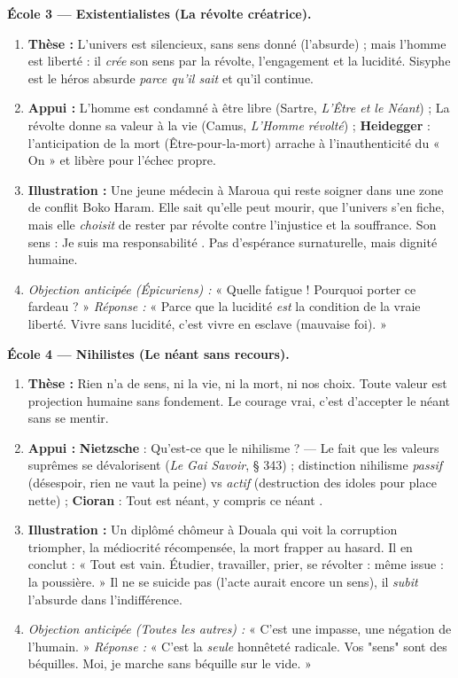 \documentclass[11pt]{article}
\newcommand{\cle}[1]{{\popxbold\color{popdark}#1}}
\begin{document}
\begin{exoresolu}
\textbf{École 3 — Existentialistes (La révolte créatrice).}
\begin{enumerate}
    \item \textbf{Thèse :} L'univers est silencieux, sans sens donné (l'absurde) ; mais l'homme est \cle{liberté} : il \emph{crée} son sens par la révolte, l'engagement et la lucidité. Sisyphe est le héros absurde \emph{parce qu'il sait} et qu'il continue.
    \item \textbf{Appui :} \guillemotleft L'homme est condamné à être libre \guillemotright (Sartre, \emph{L'Être et le Néant}) ; \guillemotleft La révolte donne sa valeur à la vie \guillemotright (Camus, \emph{L'Homme révolté}) ; \textbf{Heidegger} : l'\cle{anticipation de la mort} (Être-pour-la-mort) arrache à l'inauthenticité du « On » et libère pour l'\cle{échec} propre.
    \item \textbf{Illustration :} Une jeune médecin à Maroua qui reste soigner dans une zone de conflit Boko Haram. Elle sait qu'elle peut mourir, que l'univers s'en fiche, mais elle \emph{choisit} de rester par \cle{révolte} contre l'injustice et la souffrance. Son sens : \guillemotleft Je suis ma responsabilité \guillemotright. Pas d'espérance surnaturelle, mais \cle{dignité} humaine.
    \item \textit{Objection anticipée (Épicuriens) :} « Quelle fatigue ! Pourquoi porter ce fardeau ? » \textit{Réponse :} « Parce que la lucidité \emph{est} la condition de la vraie liberté. Vivre sans lucidité, c'est vivre en esclave (mauvaise foi). »
\end{enumerate}

\textbf{École 4 — Nihilistes (Le néant sans recours).}
\begin{enumerate}
    \item \textbf{Thèse :} Rien n'a de sens, ni la vie, ni la mort, ni nos choix. Toute valeur est projection humaine sans fondement. Le courage vrai, c'est d'accepter le néant sans se mentir.
    \item \textbf{Appui :} \textbf{Nietzsche} : \guillemotleft Qu'est-ce que le nihilisme ? — Le fait que les valeurs suprêmes se dévalorisent \guillemotright (\emph{Le Gai Savoir}, § 343) ; distinction nihilisme \emph{passif} (désespoir, rien ne vaut la peine) vs \emph{actif} (destruction des idoles pour place nette) ; \textbf{Cioran} : \guillemotleft Tout est néant, y compris ce néant \guillemotright.
    \item \textbf{Illustration :} Un diplômé chômeur à Douala qui voit la corruption triompher, la médiocrité récompensée, la mort frapper au hasard. Il en conclut : « Tout est vain. Étudier, travailler, prier, se révolter : même issue : la poussière. » Il ne se suicide pas (l'acte aurait encore un sens), il \emph{subit} l'absurde dans l'indifférence.
    \item \textit{Objection anticipée (Toutes les autres) :} « C'est une impasse, une négation de l'humain. » \textit{Réponse :} « C'est la \emph{seule} honnêteté radicale. Vos "sens" sont des béquilles. Moi, je marche sans béquille sur le vide. »
\end{enumerate}


\end{exoresolu}
\end{document}
